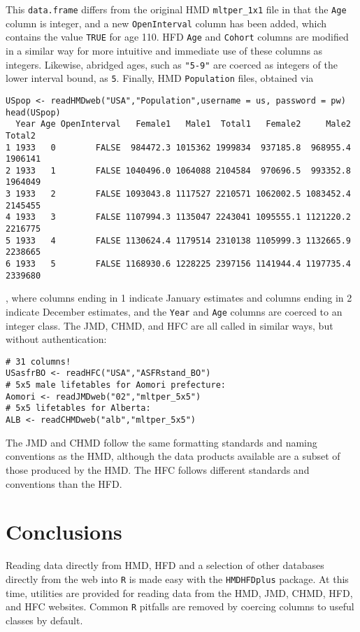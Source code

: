 \documentclass{article}
\begin{document}
This \texttt{data.frame} differs from the original HMD \texttt{mltper\_1x1} file
in that the \texttt{Age} column is integer, and a new \texttt{OpenInterval}
column has been added, which contains the value \texttt{TRUE} for age 110. HFD
\texttt{Age} and \texttt{Cohort} columns are modified in a similar way for more
intuitive and immediate use of these columns as integers. Likewise, abridged
ages, such as \texttt{"5-9"} are coerced as integers of the
lower interval bound, as \texttt{5}. Finally, HMD \texttt{Population} files, obtained via
\begin{small}
\begin{verbatim}
USpop <- readHMDweb("USA","Population",username = us, password = pw)
head(USpop)
  Year Age OpenInterval   Female1   Male1  Total1   Female2     Male2  Total2
1 1933   0        FALSE  984472.3 1015362 1999834  937185.8  968955.4 1906141
2 1933   1        FALSE 1040496.0 1064088 2104584  970696.5  993352.8 1964049
3 1933   2        FALSE 1093043.8 1117527 2210571 1062002.5 1083452.4 2145455
4 1933   3        FALSE 1107994.3 1135047 2243041 1095555.1 1121220.2 2216775
5 1933   4        FALSE 1130624.4 1179514 2310138 1105999.3 1132665.9 2238665
6 1933   5        FALSE 1168930.6 1228225 2397156 1141944.4 1197735.4 2339680
\end{verbatim}
\end{small}
, where columns ending in 1 indicate January  estimates and columns
ending in 2 indicate December  estimates, and the \texttt{Year} and
\texttt{Age} columns are coerced to an integer class. The JMD, CHMD, and HFC
are all called in similar ways, but without authentication:
\begin{small}
\begin{verbatim}
# 31 columns!
USasfrBO <- readHFC("USA","ASFRstand_BO")
# 5x5 male lifetables for Aomori prefecture:
Aomori <- readJMDweb("02","mltper_5x5")
# 5x5 lifetables for Alberta:
ALB <- readCHMDweb("alb","mltper_5x5")
\end{verbatim}
\end{small}
The JMD and CHMD follow the same formatting standards and naming conventions as
the HMD, although the data products available are a subset of those produced by
the HMD. The HFC follows different standards and conventions than the HFD.

\section{Conclusions}
Reading data directly from HMD, HFD and a selection of other databases directly
from the web into \texttt{R} is made easy with the \texttt{HMDHFDplus} package. At this time, utilities are provided for reading data from the HMD,
JMD, CHMD, HFD, and HFC websites. Common
\texttt{R} pitfalls are removed by coercing columns to useful classes by
default.
\end{document}

